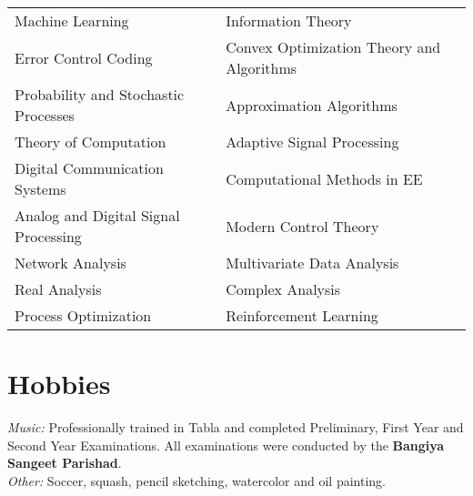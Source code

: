 \documentclass[margin, 11pt]{res} %
\begin{document}
\begin{resume}
\setlength\tabcolsep{15pt}
\begin{tabular}{ll}
	Machine Learning & Information Theory \\
	Error Control Coding & Convex Optimization Theory and Algorithms\\
	Probability and Stochastic Processes & Approximation Algorithms \\ 
	Theory of Computation & Adaptive Signal Processing \\
	Digital Communication Systems & Computational Methods in EE \\ 
	Analog and Digital Signal Processing & Modern Control Theory\\
	Network Analysis & Multivariate Data Analysis\\
	Real Analysis & Complex Analysis\\
	Process Optimization & Reinforcement Learning\\
\end{tabular}

\section{Hobbies}
{\sl Music:} Professionally trained in Tabla and completed Preliminary, First Year and Second Year Examinations. All examinations were conducted by the {\bf Bangiya Sangeet Parishad}.\\
{\sl Other:} Soccer, squash, pencil sketching, watercolor and oil painting.

%
%
% 
%


\end{resume}
\end{document}
